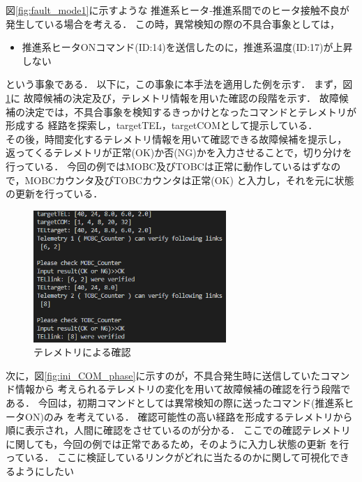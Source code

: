 \documentclass[11pt]{jsreport}
\begin{document}
図\ref{fig:fault_mode1}に示すような
推進系ヒータ‐推進系間でのヒータ接触不良が発生している場合を考える．
この時，異常検知の際の不具合事象としては，
\begin{itemize}
   \item 推進系ヒータONコマンド(ID:14)を送信したのに，推進系温度(ID:17)が上昇しない
\end{itemize}
という事象である．
以下に，この事象に本手法を適用した例を示す．
まず，図\ref{fig:tel_phase}に
故障候補の決定及び，テレメトリ情報を用いた確認の段階を示す．
故障候補の決定では，不具合事象を検知するきっかけとなったコマンドとテレメトリが形成する
経路を探索し，targetTEL，targetCOMとして提示している．\\
その後，時間変化するテレメトリ情報を用いて確認できる故障候補を提示し，
返ってくるテレメトリが正常(OK)か否(NG)かを入力させることで，切り分けを行っている．
今回の例ではMOBC及びTOBCは正常に動作しているはずなので，MOBCカウンタ及びTOBCカウンタは正常(OK)
と入力し，それを元に状態の更新を行っている．
\begin{figure}[H]
   \centering
      \includegraphics[height=5.0cm]{figure/COM14_TEL17_show_TEL_list.png}
      \caption{テレメトリによる確認}
      \label{fig:tel_phase}
\end{figure}
次に，図\ref{fig:ini_COM_phase}に示すのが，不具合発生時に送信していたコマンド情報から
考えられるテレメトリの変化を用いて故障候補の確認を行う段階である．
今回は，初期コマンドとしては異常検知の際に送ったコマンド(推進系ヒータON)のみ
を考えている．
確認可能性の高い経路を形成するテレメトリから順に表示され，人間に確認をさせているのが分かる．
ここでの確認テレメトリに関しても，今回の例では正常であるため，そのように入力し状態の更新
を行っている．
ここに検証しているリンクがどれに当たるのかに関して可視化できるようにしたい
\end{document}
